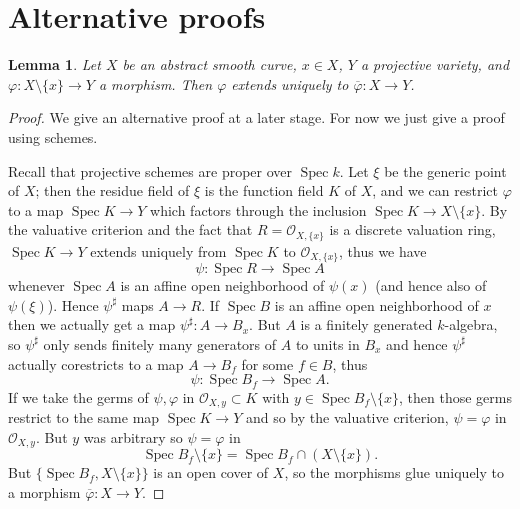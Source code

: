 \documentclass[reqno,12pt,letterpaper]{amsart}
\DeclareMathOperator{\Spec}{Spec}
\newcommand{\Olo}{\mathscr O}
\newtheorem{lemma}[theorem]{Lemma}
\theoremstyle{definition}
\begin{document}
\section{Alternative proofs}
\begin{lemma}
Let $X$ be an abstract smooth curve, $x \in X$, $Y$ a projective variety, and $\varphi: X \setminus \{x\} \to Y$ a morphism.
Then $\varphi$ extends uniquely to $\overline \varphi: X \to Y$.
\end{lemma}
\begin{proof}
We give an alternative proof at a later stage.
For now we just give a proof using schemes.

Recall that projective schemes are proper over $\Spec k$.
Let $\xi$ be the generic point of $X$; then the residue field of $\xi$ is the function field $K$ of $X$, and we can restrict $\varphi$ to a map $\Spec K \to Y$
which factors through the inclusion $\Spec K \to X \setminus \{x\}$.
By the valuative criterion and the fact that $R = \Olo_{X, \{x\}}$ is a discrete valuation ring, $\Spec K \to Y$ extends uniquely from $\Spec K$ to $\Olo_{X,\{x\}}$, thus we have
$$\psi: \Spec R \to \Spec A$$
whenever $\Spec A$ is an affine open neighborhood of $\psi(x)$ (and hence also of $\psi(\xi)$). Hence $\psi^\sharp$ maps $A \to R$.
If $\Spec B$ is an affine open neighborhood of $x$ then we actually get a map $\psi^\sharp: A \to B_x$.
But $A$ is a finitely generated $k$-algebra, so $\psi^\sharp$ only sends finitely many generators of $A$ to units in $B_x$ and hence $\psi^\sharp$ actually corestricts to a map $A \to B_f$ for some $f \in B$, thus
$$\psi: \Spec B_f \to \Spec A.$$
If we take the germs of $\psi,\varphi$ in $\Olo_{X, y} \subset K$ with $y \in \Spec B_f\setminus \{x\}$, then those germs restrict to the same map $\Spec K \to Y$ and so by the valuative criterion, $\psi = \varphi$ in $\Olo_{X, y}$.
But $y$ was arbitrary so $\psi = \varphi$ in
$$\Spec B_f \setminus\{x\} = \Spec B_f \cap (X \setminus \{x\}).$$
But $\{\Spec B_f, X \setminus \{x\}\}$ is an open cover of $X$, so the morphisms glue uniquely to a morphism $\overline \varphi: X \to Y$.
\end{proof}




\printbibliography
\end{document}
